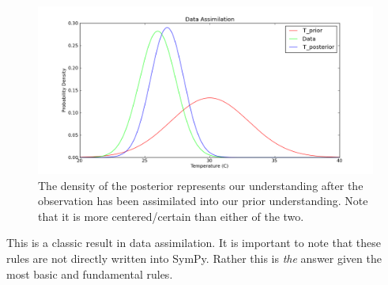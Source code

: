 \begin{figure}[ht]
\vspace{-0pt}
\centering
\includegraphics[width=.7\textwidth]{images/posterior.png}
\vspace{-0pt}
\caption{The density of the posterior represents our understanding after the observation has been assimilated into our prior understanding. Note that it is more centered/certain than either of the two. }
\label{fig:DA_posterior}
\vspace{00pt}
\end{figure}

This is a classic result in data assimilation. It is important to note that
these rules are not directly written into SymPy. Rather this is \textit{the}
answer given the most basic and fundamental rules.
